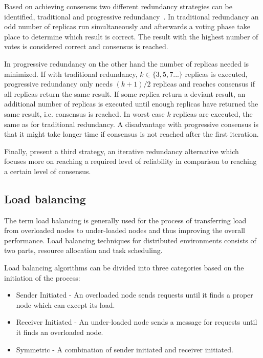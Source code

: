 \documentclass{cslthse-msc}
\begin{document}
Based on achieving consensus two different redundancy strategies can be identified, traditional and progressive redundancy~\cite{selfAdaptRel}. In traditional redundancy an odd number of replicas run simultaneously and afterwards a voting phase take place to determine which result is correct. The result with the highest number of votes is considered correct and consensus is reached.

In progressive redundancy on the other hand the number of replicas needed is minimized. If with traditional redundancy, $k \in \{3,5,7...\}$ replicas is executed, progressive redundancy only needs $(k+1)/2$ replicas and reaches consensus if all replicas return the same result. If some replica return a deviant result, an additional number of replicas is executed until enough replicas have returned the same result, i.e. consensus is reached. In worst case $k$ replicas are executed, the same as for traditional redundancy. A disadvantage with progressive consensus is that it might take longer time if consensus is not reached after the first iteration.

Finally, \cite{selfAdaptRel} present a third strategy, an iterative redundancy alternative which focuses more on reaching a required level of reliability in comparison to reaching a certain level of consensus.


\subsection{Load balancing} \label{sec:background_load_balancing}
The term load balancing is generally used for the process of transferring load from overloaded nodes to under-loaded nodes and thus improving the overall performance. Load balancing techniques for distributed environments consists of two parts, resource allocation and task scheduling. 

Load balancing algorithms can be divided into three categories based on the initiation of the process:
\begin{itemize}
\item Sender Initiated - An overloaded node sends requests until it finds a proper node which can except its load.
\item Receiver Initiated - An under-loaded node sends a message for requests until it finds an overloaded node.
\item Symmetric - A combination of sender initiated and receiver initiated. 
\end{itemize}
\end{document}
